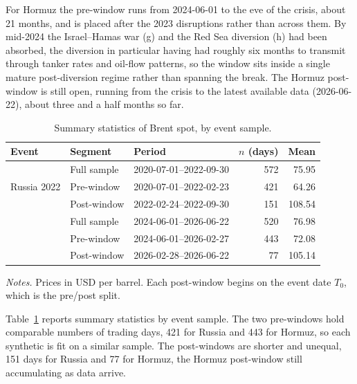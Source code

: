 For Hormuz the pre-window runs from 2024-06-01 to the eve of the crisis, about 21 months,
and is placed after the 2023 disruptions rather than across them. By mid-2024 the
Israel--Hamas war (g) and the Red Sea diversion (h) had been absorbed, the diversion in
particular having had roughly six months to transmit through tanker rates and oil-flow
patterns, so the window sits inside a single mature post-diversion regime rather than
spanning the break. The Hormuz post-window is still open, running from the crisis to the
latest available data (2026-06-22), about three and a half months so far.

\begin{table}[h]
\centering
\caption{Summary statistics of Brent spot, by event sample.}
\label{tab:summary}
\begin{threeparttable}
\small
\begin{tabular}{@{}lllrr@{}}
\toprule
Event & Segment & Period & $n$ (days) & Mean \\
\midrule
\multirow{3}{*}{Russia 2022}
 & Full sample & 2020-07-01--2022-09-30 & 572 & 75.95 \\
 & Pre-window  & 2020-07-01--2022-02-23 & 421 & 64.26 \\
 & Post-window & 2022-02-24--2022-09-30 & 151 & 108.54 \\
\addlinespace
\multirow{3}{*}{Hormuz 2026}
 & Full sample & 2024-06-01--2026-06-22 & 520 & 76.98 \\
 & Pre-window  & 2024-06-01--2026-02-27 & 443 & 72.08 \\
 & Post-window & 2026-02-28--2026-06-22 & 77  & 105.14 \\
\bottomrule
\end{tabular}
\begin{tablenotes}[flushleft]
\footnotesize
\item \textit{Notes.} Prices in USD per barrel. Each post-window begins on the event date $T_0$, which is the pre/post split.
\end{tablenotes}
\end{threeparttable}
\end{table}

Table~\ref{tab:summary} reports summary statistics by event sample. The two pre-windows
hold comparable numbers of trading days, 421 for Russia and 443 for Hormuz, so each
synthetic is fit on a similar sample. The post-windows are shorter and unequal, 151 days
for Russia and 77 for Hormuz, the Hormuz post-window still accumulating as data arrive.


